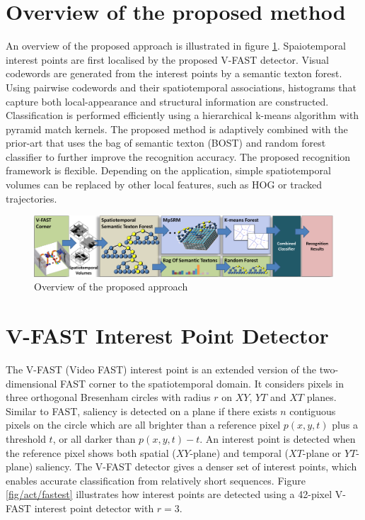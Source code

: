 \section{Overview of the proposed method}
\label{sec/act/overview}
An overview of the proposed approach is illustrated in figure \ref{fig/act/flow}. Spaiotemporal interest points are first localised by the proposed V-FAST detector. Visual codewords are generated from the interest points by a semantic texton forest. Using pairwise codewords and their spatiotemporal associations, histograms that capture both local-appearance and structural information are constructed. Classification is performed efficiently using a hierarchical k-means algorithm with pyramid match kernels. The proposed method is adaptively combined with the prior-art that uses the bag of semantic texton (BOST) and random forest classifier to further improve the recognition accuracy.
The proposed recognition framework is flexible. Depending on the application, simple spatiotemporal volumes can be replaced by other local features, such as HOG or tracked trajectories.

\begin{figure}[ht]
\includegraphics[width=1.0\linewidth]{fig/act/fig1_new.pdf}%
\caption{Overview of the proposed approach}
\label{fig/act/flow}
\end{figure}

\section{V-FAST Interest Point Detector}
\label{sec/act/fastest}
The V-FAST (Video FAST) interest point is an extended version of the two-dimensional FAST corner \cite{Rosten2006} to the spatiotemporal domain. It considers pixels in three orthogonal Bresenham circles with radius $r$ on $XY$, $YT$ and $XT$ planes. Similar to FAST, saliency is detected on a plane if there exists $n$ contiguous pixels on the circle which are all brighter than a reference pixel $p(x,y,t)$ plus a threshold $t$, or all darker than $p(x,y,t)-t$. An interest point is detected when the reference pixel shows both spatial ($XY$-plane) and temporal ($XT$-plane or $YT$-plane) saliency. The V-FAST detector gives a denser set of interest points, which enables accurate classification from relatively short sequences. Figure \ref{fig/act/fastest} illustrates how interest points are detected using a 42-pixel V-FAST interest point detector with $r = 3$.

